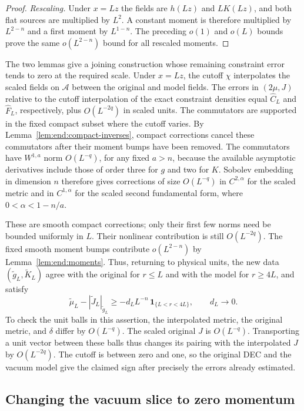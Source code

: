 \begin{proof}
\emph{Rescaling.} Under $x=Lz$ the fields are $h(Lz)$ and $LK(Lz)$,
and both flat sources are multiplied by $L^2$.  A constant moment is
therefore multiplied by $L^{2-n}$ and a first moment by
$L^{1-n}$.  The preceding $o(1)$ and $o(L)$ bounds prove the
same $o(L^{2-n})$ bound for all rescaled moments.
\end{proof}

The two lemmas give a joining construction whose remaining constraint
error tends to zero at the required scale.  Under $x=Lz$, the cutoff
$\chi$ interpolates the scaled fields on $\mathcal A$ between the
original and model fields. The errors in
$(2\mu,J)$ relative to the cutoff interpolation of the exact
constraint densities equal $\widehat C_L$ and $\widehat F_L$,
respectively, plus $O(L^{-2q})$ in scaled units. The commutators are
supported in the fixed compact subset where the cutoff varies. By
Lemma~\ref{lem:end:compact-inverses}, compact corrections cancel
these commutators after their moment bumps have been removed.  The commutators have $W^{1,a}$ norm
$O(L^{-q})$,
for any fixed $a>n$, because the available asymptotic derivatives
include those of order three for $g$ and two for $K$.
Sobolev embedding in dimension $n$ therefore gives corrections
of size $O(L^{-q})$ in $C^{2,\alpha}$ for the scaled metric
and in $C^{1,\alpha}$ for the scaled second fundamental form,
where $0<\alpha<1-n/a$.

These are smooth compact corrections; only their first few norms
need be bounded uniformly in $L$.  Their nonlinear contribution
is still $O(L^{-2q})$.  The fixed smooth moment bumps contribute
$o(L^{2-n})$ by Lemma~\ref{lem:end:moments}.  Thus, returning to
physical units, the new data $(\widetilde g_L,\widetilde K_L)$
agree with the original for $r\le L$ and with the model for
$r\ge4L$, and satisfy
\begin{equation}\label{eq:end:deficit}
 \widetilde\mu_L-|\widetilde J_L|_{\widetilde g_L}
 \ge-d_L L^{-n}\,\mathbf 1_{\{L<r<4L\}},\qquad d_L\longrightarrow0.
\end{equation}
To check the unit balls in this assertion, the interpolated
metric, the original metric, and $\delta$ differ by $O(L^{-q})$.
The scaled original $J$ is $O(L^{-q})$.  Transporting a unit
vector between these balls thus changes its pairing with the
interpolated $J$ by $O(L^{-2q})$.  The cutoff is between zero
and one, so the original DEC and the vacuum model give the
claimed sign after precisely the errors already estimated.

\subsection{Changing the vacuum slice to zero momentum}

